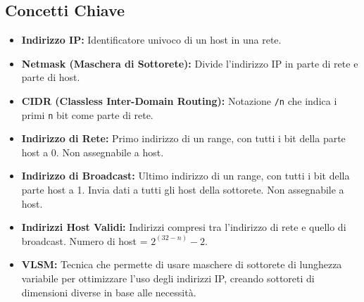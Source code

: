 \subsection{Concetti Chiave}
\begin{itemize} %
    \item \textbf{Indirizzo IP:} Identificatore univoco di un host in una rete.
    \item \textbf{Netmask (Maschera di Sottorete):} Divide l'indirizzo IP in parte di rete e parte di host.
    \item \textbf{CIDR (Classless Inter-Domain Routing):} Notazione \texttt{/n} che indica i primi \texttt{n} bit come parte di rete.
    \item \textbf{Indirizzo di Rete:} Primo indirizzo di un range, con tutti i bit della parte host a 0. Non assegnabile a host.
    \item \textbf{Indirizzo di Broadcast:} Ultimo indirizzo di un range, con tutti i bit della parte host a 1. Invia dati a tutti gli host della sottorete. Non assegnabile a host.
    \item \textbf{Indirizzi Host Validi:} Indirizzi compresi tra l'indirizzo di rete e quello di broadcast. Numero di host = $2^{(32-n)} - 2$.
    \item \textbf{VLSM:} Tecnica che permette di usare maschere di sottorete di lunghezza variabile per ottimizzare l'uso degli indirizzi IP, creando sottoreti di dimensioni diverse in base alle necessità.
\end{itemize}

